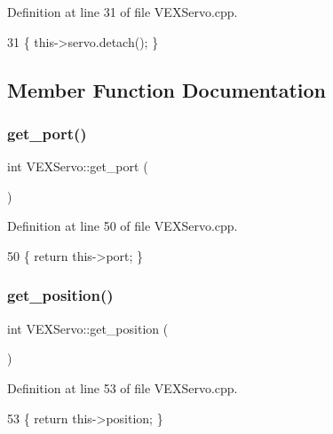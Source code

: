 Definition at line 31 of file V\+E\+X\+Servo.\+cpp.


\begin{DoxyCode}
31 \{ this->servo.detach(); \}
\end{DoxyCode}


\subsection{Member Function Documentation}
\mbox{\label{class_v_e_x_servo_a4db14049d3fc91aa7774a402238df12a}} 
\subsubsection{\texorpdfstring{get\+\_\+port()}{get\_port()}}
{\footnotesize\ttfamily int V\+E\+X\+Servo\+::get\+\_\+port (\begin{DoxyParamCaption}{ }\end{DoxyParamCaption})}



Definition at line 50 of file V\+E\+X\+Servo.\+cpp.


\begin{DoxyCode}
50 \{ \textcolor{keywordflow}{return} this->port; \}
\end{DoxyCode}
\mbox{\label{class_v_e_x_servo_ae51e5e842689c31c795870019dccec58}} 
\subsubsection{\texorpdfstring{get\+\_\+position()}{get\_position()}}
{\footnotesize\ttfamily int V\+E\+X\+Servo\+::get\+\_\+position (\begin{DoxyParamCaption}{ }\end{DoxyParamCaption})}



Definition at line 53 of file V\+E\+X\+Servo.\+cpp.


\begin{DoxyCode}
53 \{ \textcolor{keywordflow}{return} this->position; \}
\end{DoxyCode}
\mbox{\label{class_v_e_x_servo_aebc9e0de41cfb129168f5687a92c618e}} 
